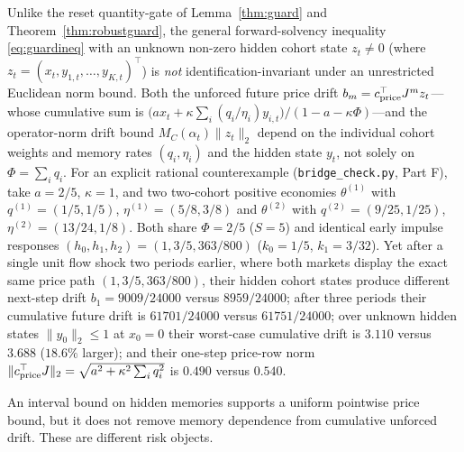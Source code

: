 \documentclass[12pt]{article}
\theoremstyle{definition}
\theoremstyle{remark}
\begin{document}
Unlike the reset quantity-gate of Lemma~\ref{thm:guard} and Theorem~\ref{thm:robustguard}, the general forward-solvency inequality \eqref{eq:guardineq} with an unknown non-zero hidden cohort state $z_t\neq 0$ (where $z_t=(x_t,y_{1,t},\ldots,y_{K,t})^\top$) is \emph{not} identification-invariant under an unrestricted Euclidean norm bound. Both the unforced future price drift $b_m=c_{\rm price}^\top J^m z_t$---whose cumulative sum is $\bigl(a x_t+\kappa\sum_i(q_i/\eta_i)y_{i,t}\bigr)/(1-a-\kappa\Phi)$---and the operator-norm drift bound $M_C(\alpha_t)\|z_t\|_2$ depend on the individual cohort weights and memory rates $(q_i,\eta_i)$ and the hidden state $y_t$, not solely on $\Phi=\sum_i q_i$. For an explicit rational counterexample (\texttt{bridge\_check.py}, Part F), take $a=2/5$, $\kappa=1$, and two two-cohort positive economies $\theta^{(1)}$ with $q^{(1)}=(1/5,1/5)$, $\eta^{(1)}=(5/8,3/8)$ and $\theta^{(2)}$ with $q^{(2)}=(9/25,1/25)$, $\eta^{(2)}=(13/24,1/8)$. Both share $\Phi=2/5$ ($S=5$) and identical early impulse responses $(h_0,h_1,h_2)=(1,3/5,363/800)$ ($k_0=1/5$, $k_1=3/32$). Yet after a single unit flow shock two periods earlier, where both markets display the exact same price path $(1,3/5,363/800)$, their hidden cohort states produce different next-step drift $b_1=9009/24000$ versus $8959/24000$; after three periods their cumulative future drift is $61701/24000$ versus $61751/24000$; over unknown hidden states $\|y_0\|_2\le 1$ at $x_0=0$ their worst-case cumulative drift is $3.110$ versus $3.688$ ($18.6\%$ larger); and their one-step price-row norm $\|c_{\rm price}^\top J\|_2=\sqrt{a^2+\kappa^2\sum_i q_i^2}$ is $0.490$ versus $0.540$.

An interval bound on hidden memories supports a uniform pointwise price bound, but it does not remove memory dependence from cumulative unforced drift. These are different risk objects.
\end{document}

